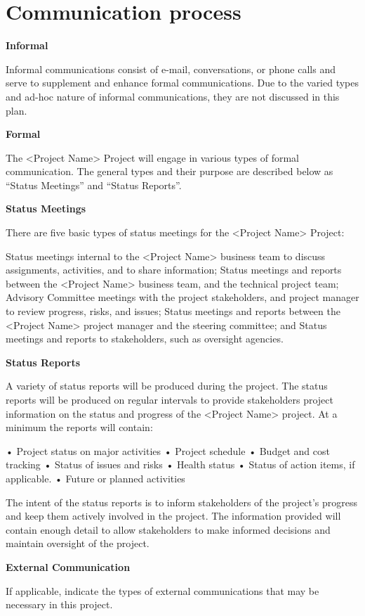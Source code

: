 \section{Communication process}

\textbf{Informal}

Informal communications consist of e-mail, conversations, or phone calls and serve to supplement and enhance formal communications. Due to the varied types and ad-hoc nature of informal communications, they are not discussed in this plan.

\textbf{Formal}

The <Project Name> Project will engage in various types of formal communication. The general types and their purpose are described below as “Status Meetings” and “Status Reports”.

\textbf{Status Meetings}

There are five basic types of status meetings for the <Project Name> Project:

Status meetings internal to the <Project Name> business team to discuss assignments, activities, and to share information; 
Status meetings and reports between the <Project Name> business team, and the technical project team; 
Advisory Committee meetings with the project stakeholders, and project manager to review progress, risks, and issues;
Status meetings and reports between the <Project Name> project manager and the steering committee; and 
Status meetings and reports to stakeholders, such as oversight agencies.



\textbf{Status Reports}

A variety of status reports will be produced during the project. The status reports will be produced on regular intervals to provide stakeholders project information on the status and progress of the <Project Name> project. At a minimum the reports will contain:

• Project status on major activities
\newline
•	Project schedule
\newline
•	Budget and cost tracking
\newline
•	Status of issues and risks
\newline
•	Health status
\newline
•	Status of action items, if applicable.
\newline
•	Future or planned activities

The intent of the status reports is to inform stakeholders of the project’s progress and keep them actively involved in the project. The information provided will contain enough detail to allow stakeholders to make informed decisions and maintain oversight of the project.

\textbf{External Communication}

If applicable, indicate the types of external communications that may be necessary in this project.

